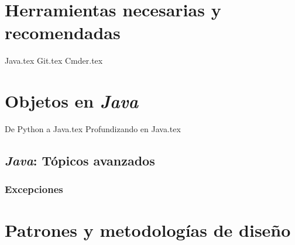\documentclass[12pt]{book}
\begin{document}
  \frontmatter
  \maketitle
  \tableofcontents
  

  \mainmatter
  \part{Herramientas necesarias y recomendadas}
    {Java.tex}
    {Git.tex}
    {Cmder.tex}
  \part{Objetos en \textit{Java}}
    
    {De Python a Java.tex}
    {Profundizando en Java.tex}
    \chapter{\textit{Java}: Tópicos avanzados}
      \label{ch:java-2}
      \section{Excepciones}
        \label{sec:exceptions}
  \part{Patrones y metodologías de diseño}
  \nocite{*}
  \printbibliography
\end{document}
